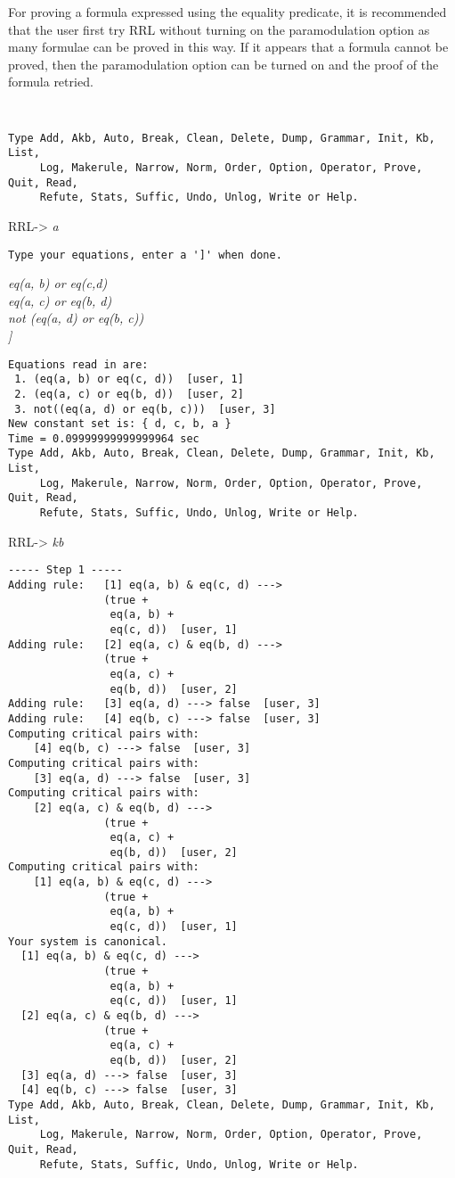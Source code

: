 For proving a formula expressed using the equality predicate,
it is recommended that the user first try RRL without turning
on the paramodulation option as many formulae can be proved 
in this way. If it appears that a formula cannot be proved,
then the paramodulation option can be turned on and the proof
of the formula retried.

\small
\tt
\begin{verbatim}
Type Add, Akb, Auto, Break, Clean, Delete, Dump, Grammar, Init, Kb, List,
     Log, Makerule, Narrow, Norm, Order, Option, Operator, Prove, Quit, Read,
     Refute, Stats, Suffic, Undo, Unlog, Write or Help.
\end{verbatim}
RRL-> {\em a}
\begin{verbatim}
Type your equations, enter a ']' when done.
\end{verbatim}
{\em eq(a, b) or eq(c,d)\\
eq(a, c) or eq(b, d)\\
not (eq(a, d) or eq(b, c))\\
] }
\begin{verbatim}
Equations read in are:
 1. (eq(a, b) or eq(c, d))  [user, 1]
 2. (eq(a, c) or eq(b, d))  [user, 2]
 3. not((eq(a, d) or eq(b, c)))  [user, 3]
New constant set is: { d, c, b, a }
Time = 0.09999999999999964 sec
Type Add, Akb, Auto, Break, Clean, Delete, Dump, Grammar, Init, Kb, List,
     Log, Makerule, Narrow, Norm, Order, Option, Operator, Prove, Quit, Read,
     Refute, Stats, Suffic, Undo, Unlog, Write or Help.
\end{verbatim}
RRL-> {\em kb}
\begin{verbatim}
----- Step 1 -----
Adding rule:   [1] eq(a, b) & eq(c, d) ---> 
               (true + 
                eq(a, b) + 
                eq(c, d))  [user, 1]
Adding rule:   [2] eq(a, c) & eq(b, d) ---> 
               (true + 
                eq(a, c) + 
                eq(b, d))  [user, 2]
Adding rule:   [3] eq(a, d) ---> false  [user, 3]
Adding rule:   [4] eq(b, c) ---> false  [user, 3]
Computing critical pairs with: 
    [4] eq(b, c) ---> false  [user, 3]
Computing critical pairs with: 
    [3] eq(a, d) ---> false  [user, 3]
Computing critical pairs with: 
    [2] eq(a, c) & eq(b, d) ---> 
               (true + 
                eq(a, c) + 
                eq(b, d))  [user, 2]
Computing critical pairs with: 
    [1] eq(a, b) & eq(c, d) ---> 
               (true + 
                eq(a, b) + 
                eq(c, d))  [user, 1]
Your system is canonical.
  [1] eq(a, b) & eq(c, d) ---> 
               (true + 
                eq(a, b) + 
                eq(c, d))  [user, 1]
  [2] eq(a, c) & eq(b, d) ---> 
               (true + 
                eq(a, c) + 
                eq(b, d))  [user, 2]
  [3] eq(a, d) ---> false  [user, 3]
  [4] eq(b, c) ---> false  [user, 3]
Type Add, Akb, Auto, Break, Clean, Delete, Dump, Grammar, Init, Kb, List,
     Log, Makerule, Narrow, Norm, Order, Option, Operator, Prove, Quit, Read,
     Refute, Stats, Suffic, Undo, Unlog, Write or Help.
\end{verbatim}

